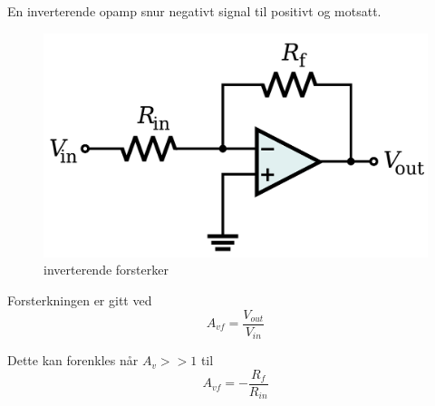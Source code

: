 En inverterende opamp snur negativt signal til positivt og motsatt.

\begin{figure}[H]
  \caption{inverterende forsterker}
  \centering
  \includegraphics[width=\textwidth]{./img/opamp-invert}
\end{figure}

Forsterkningen er gitt ved
$$A_{vf} = \frac{V_{out}}{V_{in}}$$

Dette kan forenkles når $A_v >> 1$ til
$$A_{vf} = -\frac{R_f}{R_{in}}$$
